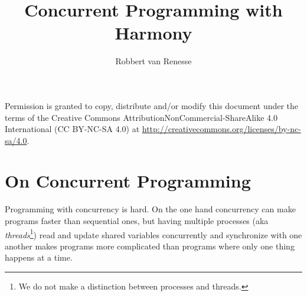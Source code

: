 \documentclass{report}
\title{Concurrent Programming with Harmony}
\author{Robbert van Renesse}
\begin{document}
\maketitle

Permission is granted to copy, distribute and/or modify this
document under the terms of the
Creative Commons AttributionNonCommercial-ShareAlike 4.0 International
(CC BY-NC-SA 4.0) at
\url{http://creativecommons.org/licenses/by-nc-sa/4.0}.

\tableofcontents

\chapter{On Concurrent Programming}

Programming with concurrency is hard.  On the one hand concurrency
can make programs faster than sequential ones, but having multiple
processes (aka \emph{threads}\footnote{We
%
do not make a distinction between processes and threads.})
read and update shared variables
%
concurrently and synchronize with one another makes programs more
complicated than programs where only one thing happens at a time.

%
%
%
%
%
\end{document}
